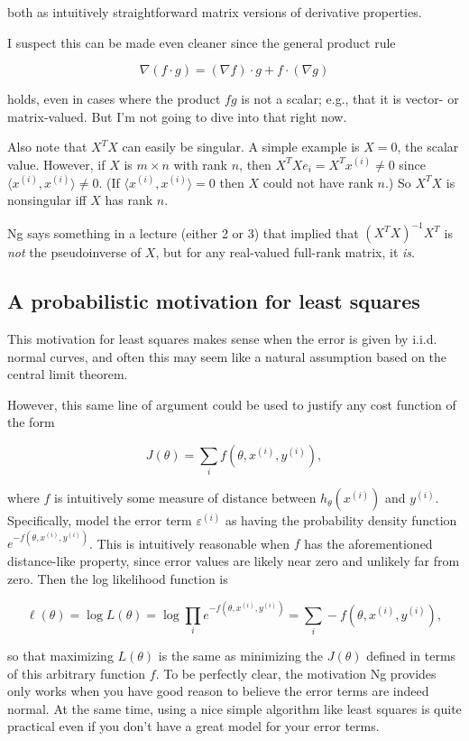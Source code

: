 \documentclass[]{article}
\begin{document}
both as intuitively straightforward matrix versions of derivative
properties.

I suspect this can be made even cleaner since the general product rule

\[\nabla(f\cdot g) = (\nabla f)\cdot g + f \cdot (\nabla g)\]

holds, even in cases where the product \(fg\) is not a scalar; e.g.,
that it is vector- or matrix-valued. But I'm not going to dive into that
right now.

Also note that \(X^TX\) can easily be singular. A simple example is
\(X=0\), the scalar value. However, if \(X\) is \(m\times n\) with rank
\(n\), then \(X^TXe_i = X^Tx^{(i)} \ne 0\) since
\(\langle x^{(i)}, x^{(i)}\rangle \ne 0.\) (If
\(\langle x^{(i)}, x^{(i)}\rangle = 0\) then \(X\) could not have rank
\(n.\)) So \(X^TX\) is nonsingular iff \(X\) has rank \(n\).

Ng says something in a lecture (either 2 or 3) that implied that
\((X^TX)^{-1}X^T\) is \emph{not} the pseudoinverse of \(X\), but for any
real-valued full-rank matrix, it \emph{is}.

\subsection{A probabilistic motivation for least
squares}\label{a-probabilistic-motivation-for-least-squares}

This motivation for least squares makes sense when the error is given by
i.i.d. normal curves, and often this may seem like a natural assumption
based on the central limit theorem.

However, this same line of argument could be used to justify any cost
function of the form

\[J(\theta) = \sum_i f(\theta, x^{(i)}, y^{(i)}),\]

where \(f\) is intuitively some measure of distance between
\(h_\theta(x^{(i)})\) and \(y^{(i)}\). Specifically, model the error
term \(\varepsilon^{(i)}\) as having the probability density function
\(e^{-f(\theta, x^{(i)}, y^{(i)})}\). This is intuitively reasonable
when \(f\) has the aforementioned distance-like property, since error
values are likely near zero and unlikely far from zero. Then the log
likelihood function is

\[\ell(\theta) = \log L(\theta)
               = \log \prod_i e^{-f(\theta, x^{(i)}, y^{(i)})}
               = \sum_i -f(\theta, x^{(i)}, y^{(i)}),\]

so that maximizing \(L(\theta)\) is the same as minimizing the
\(J(\theta)\) defined in terms of this arbitrary function \(f.\) To be
perfectly clear, the motivation Ng provides only works when you have
good reason to believe the error terms are indeed normal. At the same
time, using a nice simple algorithm like least squares is quite
practical even if you don't have a great model for your error terms.
\end{document}

